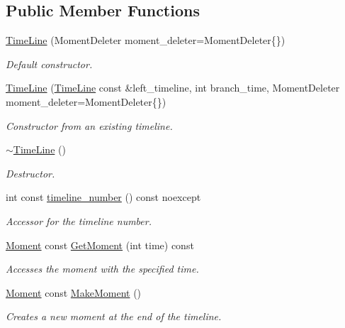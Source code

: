 \subsection*{Public Member Functions}
\begin{DoxyCompactItemize}
\item 
\hyperlink{classtimeplane_1_1_time_line_afacd08f817ddae17b1dea9c1989f74ae}{Time\+Line} (Moment\+Deleter moment\+\_\+deleter=Moment\+Deleter\{\})
\begin{DoxyCompactList}\small\item\em Default constructor. \end{DoxyCompactList}\item 
\hyperlink{classtimeplane_1_1_time_line_a5e9a864bc9838c82dc3e5a50e69ece9b}{Time\+Line} (\hyperlink{classtimeplane_1_1_time_line}{Time\+Line} const \&left\+\_\+timeline, int branch\+\_\+time, Moment\+Deleter moment\+\_\+deleter=Moment\+Deleter\{\})
\begin{DoxyCompactList}\small\item\em Constructor from an existing timeline. \end{DoxyCompactList}\item 
\hyperlink{classtimeplane_1_1_time_line_a2d16c3db644a5e8dc4c0f12622c6a4e6}{$\sim$\+Time\+Line} ()
\begin{DoxyCompactList}\small\item\em Destructor. \end{DoxyCompactList}\item 
int const \hyperlink{classtimeplane_1_1_time_line_a4297da8acc6fbee73bfc7db0de2f80a5}{timeline\+\_\+number} () const noexcept
\begin{DoxyCompactList}\small\item\em Accessor for the timeline number. \end{DoxyCompactList}\item 
\hyperlink{classtimeplane_1_1_moment}{Moment} const \hyperlink{classtimeplane_1_1_time_line_ae18ca86c0f036731e1bb148ed3381ea8}{Get\+Moment} (int time) const
\begin{DoxyCompactList}\small\item\em Accesses the moment with the specified time. \end{DoxyCompactList}\item 
\hyperlink{classtimeplane_1_1_moment}{Moment} const \hyperlink{classtimeplane_1_1_time_line_a7520362a8b33962371b1a47831b37b03}{Make\+Moment} ()
\begin{DoxyCompactList}\small\item\em Creates a new moment at the end of the timeline. \end{DoxyCompactList}\item 

\end{DoxyCompactItemize}
